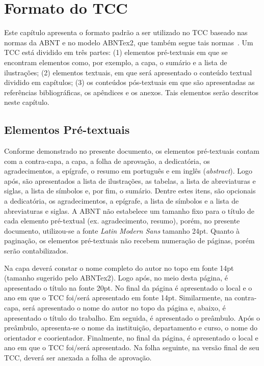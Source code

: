 \chapter[Formato do TCC]{Formato do TCC}
\label{cap:formatoTCC}

Este capítulo apresenta o formato padrão a ser utilizado no TCC baseado nas normas da ABNT e no modelo ABNTex2, que também segue tais normas~\cite{abntTxtAcad2011,abntex2modelo}. Um TCC está dividido em três partes:  (1) elementos pré-textuais em que se encontram elementos como, por exemplo, a capa, o sumário e a lista de ilustrações; (2)  elementos textuais, em que será apresentado o conteúdo textual dividido em capítulos;  (3) os conteúdos pós-textuais em que são apresentadas as referências bibliográficas, os apêndices e os anexos. Tais elementos serão descritos neste capítulo.


\section{Elementos Pré-textuais}
\label{sec:preTextual}

Conforme demonstrado no presente documento, os elementos pré-textuais contam com a contra-capa, a capa, a folha de aprovação, a dedicatória, os agradecimentos, a epígrafe, o resumo em português e em inglês (\textit{abstract}). Logo após, são apresentados a lista de ilustrações, as tabelas, a lista de abreviaturas e siglas, a lista de símbolos e, por fim, o sumário.
Dentre estes itens, são opcionais a dedicatória, os agradecimentos,  a epígrafe,  a lista de símbolos e a lista de abreviaturas e siglas. A ABNT não estabelece um tamanho fixo para o título de cada  elemento pré-textual (ex. agradecimento, resumo), porém, no presente documento,  utilizou-se a fonte \textit{Latin Modern Sans} tamanho 24pt. Quanto à paginação, os elementos pré-textuais não recebem numeração de páginas, porém serão contabilizados.


Na capa deverá constar o nome completo do autor no topo em fonte 14pt (tamanho sugerido pelo ABNTex2). Logo após, no meio desta página, é apresentado o título na fonte 20pt. No final da página é apresentado o local e o ano em que o TCC foi/será apresentado em fonte 14pt. Similarmente, na contra-capa, será apresentado o nome do autor no topo da página e, abaixo, é apresentado o título do trabalho. Em seguida, é apresentado o preâmbulo. 
Após o preâmbulo, apresenta-se o nome da instituição, departamento e curso, o nome do orientador e coorientador. Finalmente, no final da página, é apresentado o local  e ano em que o TCC foi/será apresentado. Na folha seguinte, na versão final de seu TCC, deverá ser anexada a folha de aprovação.


